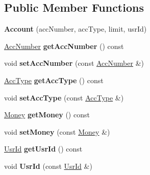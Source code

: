\subsection*{Public Member Functions}
\begin{DoxyCompactItemize}
\item 
\hypertarget{classAccount_a545be513e5087659cd021454cc81f3fe}{{\bfseries Account} (acc\-Number, acc\-Type, limit, usr\-Id)}\label{classAccount_a545be513e5087659cd021454cc81f3fe}

\item 
\hypertarget{classAccount_a74f26f24e13e66a055bb8441dfb3d881}{\hyperlink{classAccNumber}{Acc\-Number} {\bfseries get\-Acc\-Number} () const }\label{classAccount_a74f26f24e13e66a055bb8441dfb3d881}

\item 
\hypertarget{classAccount_a3e669090168f13d2a8269af456546a1e}{void {\bfseries set\-Acc\-Number} (const \hyperlink{classAccNumber}{Acc\-Number} \&)}\label{classAccount_a3e669090168f13d2a8269af456546a1e}

\item 
\hypertarget{classAccount_a34e1f7e507d7abdf575e4833d6f8d36b}{\hyperlink{classUsrType}{Acc\-Type} {\bfseries get\-Acc\-Type} () const }\label{classAccount_a34e1f7e507d7abdf575e4833d6f8d36b}

\item 
\hypertarget{classAccount_a3a8e8aa0094b2af0496d45714f694256}{void {\bfseries set\-Acc\-Type} (const \hyperlink{classUsrType}{Acc\-Type} \&)}\label{classAccount_a3a8e8aa0094b2af0496d45714f694256}

\item 
\hypertarget{classAccount_a95ade3f39d575c052f552d92940bbdb9}{\hyperlink{classMoney}{Money} {\bfseries get\-Money} () const }\label{classAccount_a95ade3f39d575c052f552d92940bbdb9}

\item 
\hypertarget{classAccount_afd2ca329c9b1cd62bd4092ad6eece944}{void {\bfseries set\-Money} (const \hyperlink{classMoney}{Money} \&)}\label{classAccount_afd2ca329c9b1cd62bd4092ad6eece944}

\item 
\hypertarget{classAccount_a59a83e5c5142f79402e79a8d42b36aed}{\hyperlink{classUsrId}{Usr\-Id} {\bfseries get\-Usr\-Id} () const }\label{classAccount_a59a83e5c5142f79402e79a8d42b36aed}

\item 
\hypertarget{classAccount_a06b7f265101bda09de561195387234bf}{void {\bfseries Usr\-Id} (const \hyperlink{classUsrId}{Usr\-Id} \&)}\label{classAccount_a06b7f265101bda09de561195387234bf}

\end{DoxyCompactItemize}
